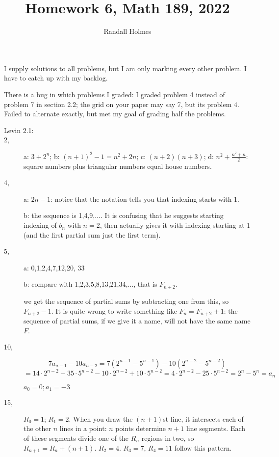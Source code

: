 \documentclass[12pt]{article}
\title{Homework 6, Math 189, 2022}
\author{Randall Holmes}
\begin{document}
\maketitle

I supply solutions to all problems, but I am only marking every other problem.  I have to catch up with my backlog.

There is a bug in which problems I graded:  I graded problem 4 instead of problem 7 in section 2.2;  the grid 
on your paper may say 7, but its problem 4.  Failed to alternate exactly, but met my goal of grading half the problems.

\begin{description}

\item[Levin 2.1:]  

\item[ 2,]  a:  $3+2^n$; b: $(n+1)^2-1=n^2+2n$; c: $(n+2)(n+3)$; d: $n^2+\frac{n^2+n}2$:  square numbers plus triangular numbers equal house numbers.

\item[4, ]  a:  $2n-1$:  notice that the notation tells you that indexing starts with 1.

b:  the sequence is 1,4,9,$\ldots$.  It is confusing that he suggests starting indexing of $b_n$ with $n=2$, then
actually gives it with indexing starting at 1 (and the first partial sum just the first term).

\item[5,]  a:  0,1,2,4,7,12,20, 33

b: compare with 1,2,3,5,8,13,21,34,$\ldots$, that is $F_{n+2}$.

we get the sequence of partial sums by subtracting one from this, so $F_{n+2}-1$.   It is quite wrong to write something
like $F_n = F_{n+2}+1$:  the sequence of partial sums, if we give it a name, will not have the same name $F$.

\item[10, ]  $$7a_{n-1}-10a_{n-2}= 7(2^{n-1} -5^{n-1})-10(2^{n-2}-5^{n-2}) $$ $$= 14\cdot2^{n-2} - 35\cdot5^{n-2}-10\cdot2^{n-2}+10\cdot5^{n-2} = 4\cdot2^{n-2} - 25\cdot5^{n-2} = 2^n - 5^n = a_n$$

$a_0 = 0;  a_1= -3$

\item[15,]  $R_0 = 1$; $R_1=2$.  When you draw the $(n+1)$st line, it intersects each of the other $n$ lines in a point:
$n$ points determine $n+1$ line segments.  Each of these segments divide one of the $R_n$ regions in two,
so $R_{n+1}=R_n+(n+1)$.  $R_2 = 4$. $R_3=7$, $R_4 = 11$ follow this pattern.


\end{description}
\end{document}
